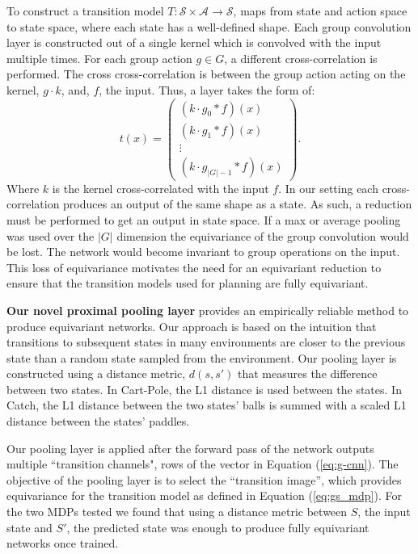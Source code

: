 \documentclass[mlabstract]{jmlr}
\begin{document}
To construct a transition model $T: \mathcal{S} \times \mathcal{A} \rightarrow \mathcal{S}$, maps from state and action space to state space, where each state has a well-defined shape. Each group convolution layer is constructed out of a single kernel which is convolved with the input multiple times. For each group action $g \in G$, a different cross-correlation is performed. The cross cross-correlation is between the group action acting on the kernel, $g\cdot k$, and, $f$, the input. Thus, a layer takes the form of:
\begin{equation}
	t(x) = \begin{pmatrix}
		(k \cdot g_0* f )(x)  \\
		(k \cdot g_1 * f )(x) \\
		\vdots                \\
		(k \cdot g_{|G|-1} * f)(x)
	\end{pmatrix}.
	\label{eq:g-cnn}
\end{equation}
Where $k$ is the kernel cross-correlated with the input $f$. In our setting each cross-correlation produces an output of the same shape as a state. As such, a reduction must be performed to get an output in state space. If a max or average pooling was used over the $|G|$ dimension the equivariance of the group convolution would be lost. The network would become invariant to group operations on the input. This loss of equivariance motivates the need for an equivariant reduction to ensure that the transition models used for planning are fully equivariant.

\textbf{Our novel proximal pooling layer} provides an empirically reliable method to produce equivariant networks. Our approach is based on the intuition that transitions to subsequent states in many environments are closer to the previous state than a random state sampled from the environment. Our pooling layer is constructed using a distance metric, $d(s, s')$ that measures the difference between two states. In Cart-Pole, the L1 distance is used between the states. In Catch, the L1 distance between the two states' balls is summed with a scaled L1 distance between the states' paddles.

Our pooling layer is applied after the forward pass of the network outputs multiple ``transition channels", rows of the vector in Equation (\ref{eq:g-cnn}). The objective of the pooling layer is to select the ``transition image'', which provides equivariance for the transition model as defined in Equation (\ref{eq:gs_mdp}). For the two MDPs tested we found that using a distance metric between $S$, the input state and $S'$, the predicted state was enough to produce fully equivariant networks once trained.
\end{document}
